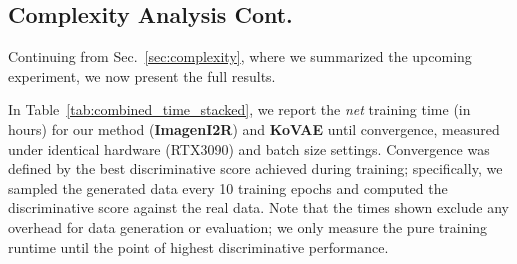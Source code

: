 \documentclass{article}
\theoremstyle{plain}
\theoremstyle{definition}
\theoremstyle{remark}
\begin{document}
\begin{table}[!t]
    \centering
    \small %
    \setlength{\tabcolsep}{2pt} %
    \caption{Wasserstein distances between original data clusters, generated samples, and clusters from KoVAE for various missing rates $(30\%, 50\%, 70\%)$ and sequence lengths. Lower values indicate better similarity.}
    \label{tab:wass_dist}
    
\end{table}


\clearpage

\subsection{Complexity Analysis Cont.}
\label{sec:complexity_analyis_cont}
Continuing from Sec.~\ref{sec:complexity}, where we summarized the upcoming experiment, we now present the full results.

In Table~\ref{tab:combined_time_stacked}, we report the  \emph{net} training time (in hours) for our method (\textbf{ImagenI2R}) and \textbf{KoVAE} until convergence, measured under identical hardware (RTX3090) and batch size settings. Convergence was defined by the best discriminative score achieved during training; specifically, we sampled the generated data every 10 training epochs and computed the discriminative score against the real data. Note that the times shown exclude any overhead for data generation or evaluation; we only measure the pure training runtime until the point of highest discriminative performance.
\end{document}

